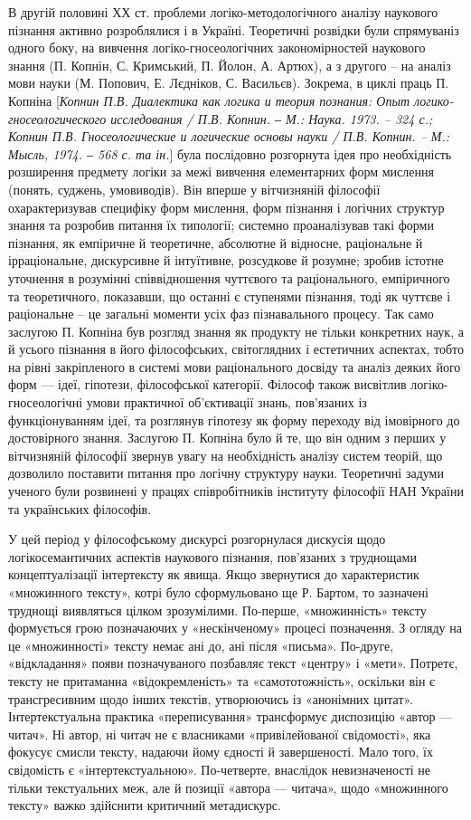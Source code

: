 В другій половині ХХ ст. проблеми логіко-методологічного аналізу
наукового пізнання активно розроблялися і в Україні. Теоретичні розвідки були
спрямуваніз одного боку, на вивчення логіко-гносеологічних закономірностей
наукового знання (П. Копнін, С. Кримський, П. Йолон, А. Артюх), а з другого –
на аналіз мови науки (М. Попович, Е. Лєдніков, С. Васильєв). Зокрема, в циклі
праць П. Копніна [\textit{Копнин П.В. Диалектика как логика и теория познания:
Опыт логико-гносеологического исследования / П.В. Копнин. ‒ М.: Наука. 1973.
– 324 с.; Копнин П.В. Гносеологические и логические основы науки / П.В.
Копнин. – М.: Мысль, 1974. ‒ 568 с. та ін.}] була послідовно розгорнута ідея про
необхідність розширення предмету логіки за межі вивчення елементарних форм
мислення (понять, суджень, умовиводів). Він вперше у вітчизняній філософії
охарактеризував специфіку форм мислення, форм пізнання і логічних структур
знання та розробив питання їх типології; системно проаналізував такі форми
пізнання, як емпіричне й теоретичне, абсолютне й відносне, раціональне й
ірраціональне, дискурсивне й інтуїтивне, розсудкове й розумне; зробив істотне
уточнення в розумінні співвідношення чуттєвого та раціонального,
емпіричного та теоретичного, показавши, що останні є ступенями пізнання, тоді
як чуттєве і раціональне – це загальні моменти усіх фаз пізнавального процесу.
Так само заслугою П. Копніна був розгляд знання як продукту не тільки
конкретних наук, а й усього пізнання в його філософських, світоглядних і
естетичних аспектах, тобто на рівні закріпленого в системі мови раціонального
досвіду та аналіз деяких його форм --- ідеї, гіпотези, філософської категорії.
Філософ також висвітлив логіко-гносеологічні умови практичної об’єктивації
знань, пов’язаних із функціонуванням ідеї, та розглянув гіпотезу як форму
переходу від імовірного до достовірного знання. Заслугою П. Копніна було й
те, що він одним з перших у вітчизняній філософії звернув увагу на
необхідність аналізу систем теорій, що дозволило поставити питання про
логічну структуру науки. Теоретичні задуми ученого були розвинені у працях
співробітників інституту філософії НАН України та українських філософів.

У цей період у філософському дискурсі розгорнулася дискусія щодо логікосемантичних аспектів наукового пізнання, пов’язаних з труднощами
концептуалізації інтертексту як явища. Якщо звернутися до характеристик
«множинного тексту», котрі було сформульовано ще Р. Бартом, то зазначені
труднощі виявляться цілком зрозумілими. По-перше, «множинність» тексту
формується грою позначаючих у «нескінченому» процесі позначення. З огляду
на це «множинності» тексту немає ані до, ані після «письма». По-друге,
«відкладання» появи позначуваного позбавляє текст «центру» і «мети». Потретє, тексту не притаманна «відокремленість» та «самототожність», оскільки
він є трансгресивним щодо інших текстів, утворюючись із «анонімних цитат».
Інтертекстуальна практика «переписування» трансформує диспозицію «автор ---
читач». Ні автор, ні читач не є власниками «привілейованої свідомості», яка
фокусує смисли тексту, надаючи йому єдності й завершеності. Мало того, їх
свідомість є «інтертекстуальною». По-четверте, внаслідок невизначеності не
тільки текстуальних меж, але й позиції «автора --- читача», щодо «множинного
тексту» важко здійснити критичний метадискурс.

